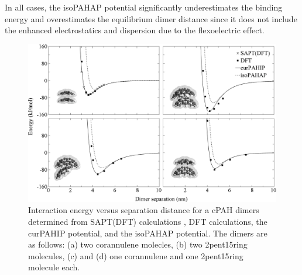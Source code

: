 In all cases, the isoPAHAP potential significantly underestimates the binding energy and overestimates the equilibrium dimer distance since it does not include the enhanced electrostatics and dispersion due to the flexoelectric effect.
%
\begin{figure}[!tbh]
\centering
\includegraphics[width=1\linewidth]{Figures/potentialDFT_curves.eps}
\caption{Interaction energy versus separation distance for a cPAH dimers determined from SAPT(DFT) calculations \cite{Cabaleiro-Lago2018}, DFT calculations, the curPAHIP potential, and the isoPAHAP potential. The dimers are as follows: (a) two corannulene molecles, (b) two 2pent15ring molecules, (c) and (d) one corannulene and one 2pent15ring molecule each.}
\label{fig:potentialDFTcurves}
\end{figure}
%


